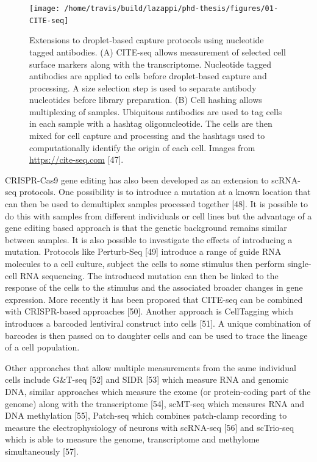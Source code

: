 \documentclass[11pt,a4paper,titlepage,twoside,openright]{style/unimelbthesis}
\theoremstyle{definition}
\theoremstyle{definition}
\theoremstyle{definition}
\theoremstyle{remark}
\begin{document}
\begin{mainmatter}
\begin{figure}

{\centering \texttt{[image: /home/travis/build/lazappi/phd-thesis/figures/01-CITE-seq]} 

}

\caption[Extensions to droplet-based capture protocols using nucleotide tagged antibodies.]{Extensions to droplet-based capture protocols using nucleotide tagged antibodies. (A) CITE-seq allows measurement of selected cell surface markers along with the transcriptome. Nucleotide tagged antibodies are applied to cells before droplet-based capture and processing. A size selection step is used to separate antibody nucleotides before library preparation. (B) Cell hashing allows multiplexing of samples. Ubiquitous antibodies are used to tag cells in each sample with a hashtag oligonucleotide. The cells are then mixed for cell capture and processing and the hashtags used to computationally identify the origin of each cell. Images from \url{https://cite-seq.com} {[}47{]}.}\label{fig:CITE-seq}
\end{figure}





CRISPR-Cas9 gene editing has also been developed as an extension to scRNA-seq protocols. One possibility is to introduce a mutation at a known location that can then be used to demultiplex samples processed together {[}48{]}. It is possible to do this with samples from different individuals or cell lines but the advantage of a gene editing based approach is that the genetic background remains similar between samples. It is also possible to investigate the effects of introducing a mutation. Protocols like Perturb-Seq {[}49{]} introduce a range of guide RNA molecules to a cell culture, subject the cells to some stimulus then perform single-cell RNA sequencing. The introduced mutation can then be linked to the response of the cells to the stimulus and the associated broader changes in gene expression. More recently it has been proposed that CITE-seq can be combined with CRISPR-based approaches {[}50{]}. Another approach is CellTagging which introduces a barcoded lentiviral construct into cells {[}51{]}. A unique combination of barcodes is then passed on to daughter cells and can be used to trace the lineage of a cell population.

Other approaches that allow multiple measurements from the same individual cells include G\&T-seq {[}52{]} and SIDR {[}53{]} which measure RNA and genomic DNA, similar approaches which measure the exome (or protein-coding part of the genome) along with the transcriptome {[}54{]}, scMT-seq which measures RNA and DNA methylation {[}55{]}, Patch-seq which combines patch-clamp recording to measure the electrophysiology of neurons with scRNA-seq {[}56{]} and scTrio-seq which is able to measure the genome, transcriptome and methylome simultaneously {[}57{]}.


\end{mainmatter}
\end{document}
